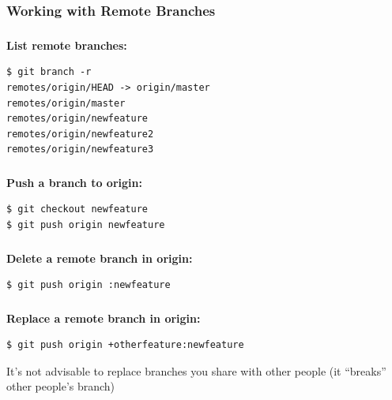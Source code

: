 
\subsubsection{Working with Remote Branches}

\begin{frame}[fragile]
  \frametitle{\insertsubsubsection}

\textbf{List remote branches:}\\
\begin{verbatim}
$ git branch -r
remotes/origin/HEAD -> origin/master
remotes/origin/master
remotes/origin/newfeature
remotes/origin/newfeature2
remotes/origin/newfeature3
\end{verbatim}

\end{frame}


\begin{frame}[fragile]
  \frametitle{\insertsubsection}

  \textbf{Push a branch to origin:}\\
\begin{verbatim}
$ git checkout newfeature
$ git push origin newfeature
\end{verbatim}

\end{frame}


\begin{frame}[fragile]
  \frametitle{\insertsubsection}

  \textbf{Delete a remote branch in origin:}\\
\begin{verbatim}
$ git push origin :newfeature
\end{verbatim}

\end{frame}


\begin{frame}[fragile]
  \frametitle{\insertsubsection}

  \textbf{Replace a remote branch in origin:}\\
\begin{verbatim}
$ git push origin +otherfeature:newfeature
\end{verbatim}

It's not advisable to replace branches you share with other people (it ``breaks'' other people's branch)

\end{frame}

